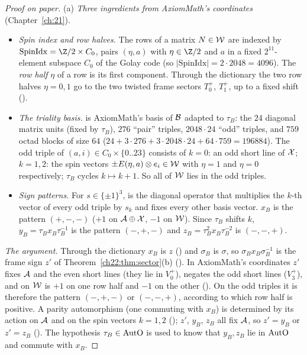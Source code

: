 \begin{proof}[Proof on paper]
(a) \emph{Three ingredients from AxiomMath's coordinates} (Chapter~\ref{ch:21}).
\begin{itemize}
\item \emph{Spin index and row halves.}  The rows of a matrix $N\in\mathcal{W}$ are indexed by
  $\mathrm{SpinIdx}=\Z/2\times C_0$, pairs $(\eta,a)$ with $\eta\in\Z/2$ and $a$ in a fixed $2^{11}$-element subspace $C_0$ of
  the Golay code (so $|\mathrm{SpinIdx}|=2\cdot2048=4096$).  The \emph{row half}
  $\eta$ of a row is its first component.  Through the dictionary the two row halves $\eta=0,1$ go to the two twisted frame
  sectors $T_0^+$, $T_1^+$, up to a fixed shift ().
\item \emph{The triality basis.}   is AxiomMath's basis of $\mathcal{B}$ adapted to $\tau_B$: the $24$ diagonal
  matrix units (fixed by $\tau_B$), $276$ ``pair'' triples, $2048\cdot24$ ``odd'' triples, and $759$ octad blocks of size $64$ ($24+3\cdot276+3\cdot2048\cdot24+64\cdot759=196884$).
  The odd triple of $(a,i)\in C_0\times\{0..23\}$ consists of $k=0$: an odd short line of $\mathcal{X}$; $k=1,2$: the spin
  vectors $\pm E(\eta,a)\otimes e_i\in\mathcal{W}$ with $\eta=1$ and $\eta=0$ respectively; $\tau_B$ cycles $k\mapsto k+1$.  So
  all of $\mathcal{W}$ lies in the odd triples.
\item \emph{Sign patterns.}  For $s\in\{\pm1\}^3$,  is the diagonal operator that multiplies the $k$-th vector of
  every odd triple by $s_k$ and fixes every other basis vector.  $x_B$ is the pattern $(+,-,-)$ ($+1$ on $\mathcal{A}\oplus
  \mathcal{X}$, $-1$ on $\mathcal{W}$).  Since $\tau_B$ shifts $k$, $y_B=\tau_Bx_B\tau_B^{-1}$ is the pattern $(-,+,-)$ and
  $z_B=\tau_B^2x_B\tau_B^{-2}$ is $(-,-,+)$.
\end{itemize}
\emph{The argument.}  Through the dictionary $x_B$ is $z$ () and $\sigma_B$ is $\sigma$, so
$\sigma_Bx_B\sigma_B^{-1}$ is the frame sign $z'$ of Theorem~\ref{ch22:thm:sector}(b) ().  In
AxiomMath's coordinates $z'$ fixes $\mathcal{A}$ and the even short lines (they lie in $V_0^+$), negates the odd short lines
($V_3^+$), and on $\mathcal{W}$ is $+1$ on one row half and $-1$ on the other ().  On the odd
triples it is therefore the pattern $(-,+,-)$ or $(-,-,+)$, according to which row half is positive.  A parity automorphism
(one commuting with $x_B$) is determined by its action on $\mathcal{A}$ and on the spin vectors $k=1,2$
(); $z'$, $y_B$, $z_B$ all fix $\mathcal{A}$, so $z'=y_B$ or $z'=z_B$
().  The hypothesis $\tau_B\in\mathrm{AutO}$ is used to know that $y_B,z_B$ lie in
$\mathrm{AutO}$ and commute with $x_B$.


\end{proof}
